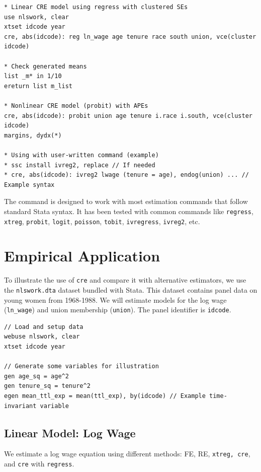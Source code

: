 \documentclass[bib]{statapress}
\begin{document}
\begin{verbatim}
* Linear CRE model using regress with clustered SEs
use nlswork, clear
xtset idcode year
cre, abs(idcode): reg ln_wage age tenure race south union, vce(cluster idcode)

* Check generated means
list _m* in 1/10
ereturn list m_list

* Nonlinear CRE model (probit) with APEs
cre, abs(idcode): probit union age tenure i.race i.south, vce(cluster idcode)
margins, dydx(*)

* Using with user-written command (example)
* ssc install ivreg2, replace // If needed
* cre, abs(idcode): ivreg2 lwage (tenure = age), endog(union) ... // Example syntax
\end{verbatim}

The command is designed to work with most estimation commands that
follow standard Stata syntax. It has been tested with common commands
like \texttt{regress}, \texttt{xtreg}, \texttt{probit}, \texttt{logit},
\texttt{poisson}, \texttt{tobit}, \texttt{ivregress}, \texttt{ivreg2},
etc.

\section{Empirical Application}\label{sec-4}

To illustrate the use of \texttt{cre} and compare it with alternative
estimators, we use the \texttt{nlswork.dta} dataset bundled with Stata.
This dataset contains panel data on young women from 1968-1988. We will
estimate models for the log wage (\texttt{ln\_wage}) and union
membership (\texttt{union}). The panel identifier is \texttt{idcode}.

\begin{verbatim}
// Load and setup data
webuse nlswork, clear
xtset idcode year

// Generate some variables for illustration
gen age_sq = age^2
gen tenure_sq = tenure^2
egen mean_ttl_exp = mean(ttl_exp), by(idcode) // Example time-invariant variable
\end{verbatim}

\subsection{Linear Model: Log Wage}\label{linear-model-log-wage}

We estimate a log wage equation using different methods: FE, RE,
\texttt{xtreg,\ cre}, and \texttt{cre} with \texttt{regress}.
\end{document}
